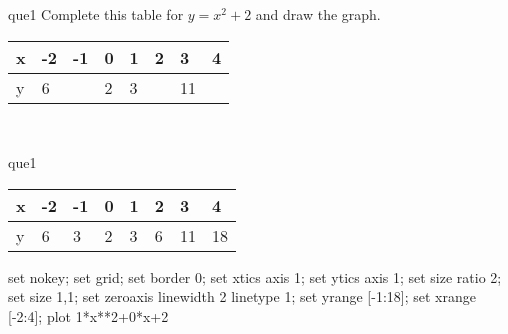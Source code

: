 \documentclass[13.5pt, varwidth=true]{beamer}
\begin{document}
\begin{frame}[shrink=19,fragile]
	\begin{beamercolorbox}[rounded=true, left, shadow=true,wd=14.8cm]{que1}
		 Complete this table for $y = x^{2} + 2$ and draw the graph. \\[0.3cm] \renewcommand{\arraystretch}{1.2}\begin{tabular}{|C|C|C|C|C|C|C|C|} \hline x & -2 & -1 & 0 & 1 & 2 & 3 & 4 \\ \hline y & 6 &  & 2 & 3 &  & 11 & \\ \hline \end{tabular}\\[0.3cm]
	\end{beamercolorbox}
\end{frame}
\begin{frame}[shrink=19,fragile]
	\begin{beamercolorbox}[rounded=true, left, shadow=true,wd=14.8cm]{que1}
		\renewcommand{\arraystretch}{1.2}\begin{tabular}{|C|C|C|C|C|C|C|C|} \hline x & -2 & -1 & 0 & 1 & 2 & 3 & 4 \\ \hline y & 6 & 3 & 2 & 3 & 6 & 11 & 18\\ \hline \end{tabular}\begin{gnuplot}[terminal=pdf] set nokey; set grid; set border 0; set xtics axis 1; set ytics axis 1; set size ratio 2; set size 1,1; set zeroaxis linewidth 2 linetype 1; set yrange [-1:18]; set xrange [-2:4]; plot 1*x**2+0*x+2 \end{gnuplot}
	\end{beamercolorbox}
\end{frame}
\end{document}

